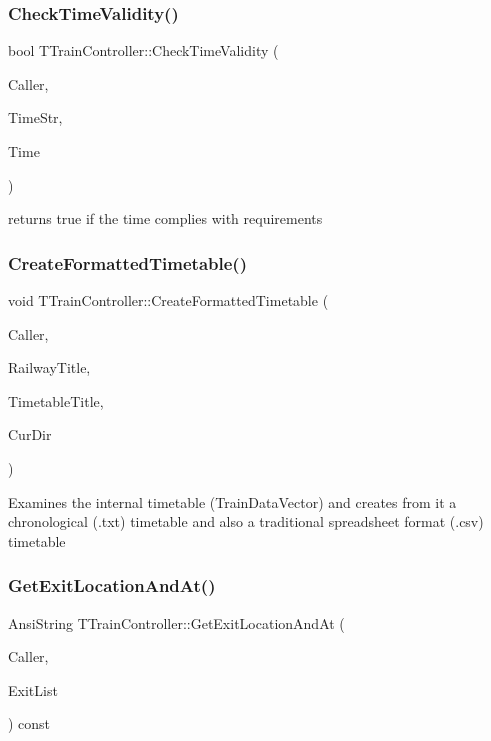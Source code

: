 \subsubsection{\texorpdfstring{Check\+Time\+Validity()}{CheckTimeValidity()}}
{\footnotesize\ttfamily bool T\+Train\+Controller\+::\+Check\+Time\+Validity (\begin{DoxyParamCaption}\item[{int}]{Caller,  }\item[{Ansi\+String}]{Time\+Str,  }\item[{T\+Date\+Time \&}]{Time }\end{DoxyParamCaption})}

returns true if the time complies with requirements \mbox{\label{class_t_train_controller_a4ab4b6a568064d27c65f0770e5a5ccd0}} 
\subsubsection{\texorpdfstring{Create\+Formatted\+Timetable()}{CreateFormattedTimetable()}}
{\footnotesize\ttfamily void T\+Train\+Controller\+::\+Create\+Formatted\+Timetable (\begin{DoxyParamCaption}\item[{int}]{Caller,  }\item[{Ansi\+String}]{Railway\+Title,  }\item[{Ansi\+String}]{Timetable\+Title,  }\item[{Ansi\+String}]{Cur\+Dir }\end{DoxyParamCaption})}

Examines the internal timetable (Train\+Data\+Vector) and creates from it a chronological (.txt) timetable and also a traditional spreadsheet format (.csv) timetable \mbox{\label{class_t_train_controller_ae6c904f201d8bb23b3c0714226244890}} 
\subsubsection{\texorpdfstring{Get\+Exit\+Location\+And\+At()}{GetExitLocationAndAt()}}
{\footnotesize\ttfamily Ansi\+String T\+Train\+Controller\+::\+Get\+Exit\+Location\+And\+At (\begin{DoxyParamCaption}\item[{int}]{Caller,  }\item[{T\+Exit\+List \&}]{Exit\+List }\end{DoxyParamCaption}) const}

